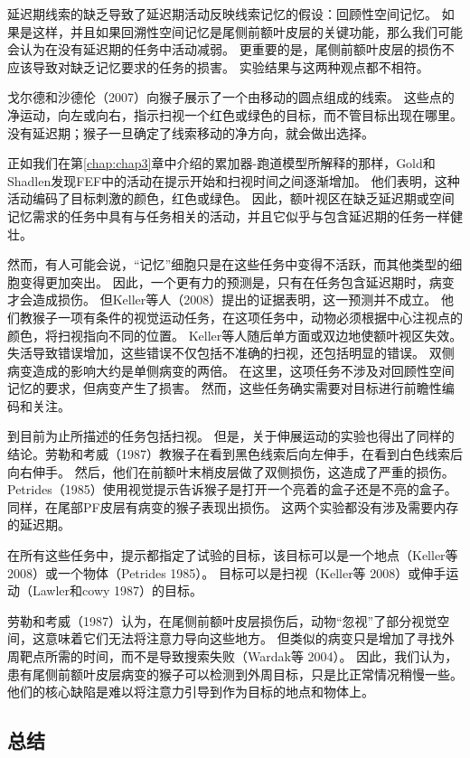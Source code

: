 延迟期线索的缺乏导致了延迟期活动反映线索记忆的假设：回顾性空间记忆。
如果是这样，并且如果回溯性空间记忆是尾侧前额叶皮层的关键功能，那么我们可能会认为在没有延迟期的任务中活动减弱。
更重要的是，尾侧前额叶皮层的损伤不应该导致对缺乏记忆要求的任务的损害。
实验结果与这两种观点都不相符。


戈尔德和沙德伦（2007）向猴子展示了一个由移动的圆点组成的线索。
这些点的净运动，向左或向右，指示扫视一个红色或绿色的目标，而不管目标出现在哪里。
没有延迟期；猴子一旦确定了线索移动的净方向，就会做出选择。


正如我们在第\ref{chap:chap3}章中介绍的累加器-跑道模型所解释的那样，Gold和Shadlen发现FEF中的活动在提示开始和扫视时间之间逐渐增加。
他们表明，这种活动编码了目标刺激的颜色，红色或绿色。
因此，额叶视区在缺乏延迟期或空间记忆需求的任务中具有与任务相关的活动，并且它似乎与包含延迟期的任务一样健壮。


然而，有人可能会说，“记忆”细胞只是在这些任务中变得不活跃，而其他类型的细胞变得更加突出。
因此，一个更有力的预测是，只有在任务包含延迟期时，病变才会造成损伤。
但Keller等人（2008）提出的证据表明，这一预测并不成立。
他们教猴子一项有条件的视觉运动任务，在这项任务中，动物必须根据中心注视点的颜色，将扫视指向不同的位置。
Keller等人随后单方面或双边地使额叶视区失效。
失活导致错误增加，这些错误不仅包括不准确的扫视，还包括明显的错误。
双侧病变造成的影响大约是单侧病变的两倍。
在这里，这项任务不涉及对回顾性空间记忆的要求，但病变产生了损害。
然而，这些任务确实需要对目标进行前瞻性编码和关注。


到目前为止所描述的任务包括扫视。
但是，关于伸展运动的实验也得出了同样的结论。劳勒和考威（1987）教猴子在看到黑色线索后向左伸手，在看到白色线索后向右伸手。
然后，他们在前额叶末梢皮层做了双侧损伤，这造成了严重的损伤。
Petrides（1985）使用视觉提示告诉猴子是打开一个亮着的盒子还是不亮的盒子。
同样，在尾部PF皮层有病变的猴子表现出损伤。
这两个实验都没有涉及需要内存的延迟期。


在所有这些任务中，提示都指定了试验的目标，该目标可以是一个地点（Keller等 2008）或一个物体（Petrides 1985）。
目标可以是扫视（Keller等 2008）或伸手运动（Lawler和cowy 1987）的目标。


劳勒和考威（1987）认为，在尾侧前额叶皮层损伤后，动物“忽视”了部分视觉空间，这意味着它们无法将注意力导向这些地方。
但类似的病变只是增加了寻找外周靶点所需的时间，而不是导致搜索失败（Wardak等 2004）。
因此，我们认为，患有尾侧前额叶皮层病变的猴子可以检测到外周目标，只是比正常情况稍慢一些。
他们的核心缺陷是难以将注意力引导到作为目标的地点和物体上。



\subsection{总结}

